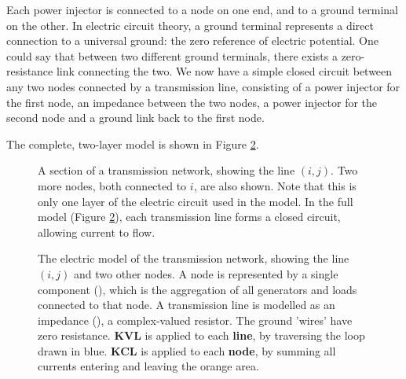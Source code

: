 \documentclass[main.tex]{subfiles}
\begin{document}
Each power injector is connected to a node on one end, and to a ground terminal on the other. In electric circuit theory, a ground terminal represents a direct connection to a universal ground: the zero reference of electric potential. One could say that between two different ground terminals, there exists a zero-resistance link connecting the two. 
We now have a simple closed circuit between any two nodes connected by a transmission line, consisting of a power injector for the first node, an impedance between the two nodes, a power injector for the second node and a ground link back to the first node.

The complete, two-layer model is shown in Figure \ref{fig:KVLcircuitside}.


\begin{figure}
    \centering
    \begin{adjustbox}{width=.6\textwidth}
    
    \end{adjustbox}
    \caption{A section of a transmission network, showing the line $(i,j)$. Two more nodes, both connected to $i$, are also shown. Note that this is only one layer of the electric circuit used in the model. In the full model (Figure \ref{fig:KVLcircuitside}), each transmission line forms a closed circuit, allowing current to flow.}
    \label{fig:KVLcircuit}
\end{figure}

\begin{figure}
    \centering
    \begin{adjustbox}{width=.9\textwidth}
    
    \end{adjustbox}
    \caption{
    The electric model of the transmission network, showing the line $(i,j)$ and two other nodes. A node is represented by a single component (\inlineac), which is the aggregation of all generators and loads connected to that node. A transmission line is modelled as an impedance (\inlineres), a complex-valued resistor. The ground 'wires' have zero resistance. \protect\newline
    \textbf{KVL} is applied to each \textbf{line}, by traversing the loop drawn in blue.\protect\newline
    \textbf{KCL} is applied to each \textbf{node}, by summing all currents entering and leaving the orange area.}
    \label{fig:KVLcircuitside}
\end{figure}
\end{document}
